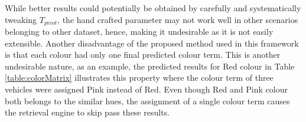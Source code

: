 While better results could potentially be obtained by carefully and
systematically tweaking $T_{pivot}$, the hand crafted parameter may not work
well in other scenarios belonging to other dataset, hence, making it undesirable
as it is not easily extensible. Another disadvantage of the proposed method
used in this framework is that each colour had only one final predicted colour
term. This is another undesirable nature, as an example, the predicted results
for Red colour in Table \ref{table:colorMatrix} illustrates this property where
the colour term of three vehicles were assigned Pink instead of Red. Even
though Red and Pink colour both belongs to the similar hues, the assignment of
a single colour term causes the retrieval engine to skip pass these results.


\begin{table}[!ht]
\centering
\caption{Confusion Matrix for Colour Retrieval Task}
\vspace{1.5em}
\label{table:colorMatrix}
\end{table}
